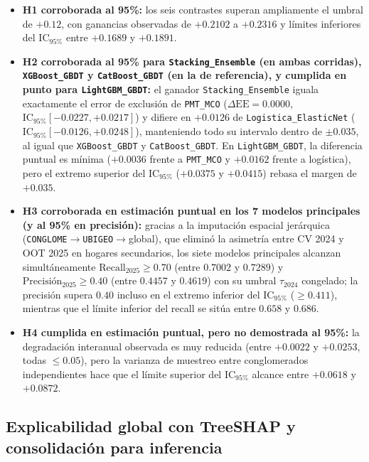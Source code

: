 \begin{itemize}
    \item \textbf{H1 corroborada al 95\%:} los seis contrastes superan ampliamente el umbral de $+0.12$, con ganancias observadas de $+0.2102$ a $+0.2316$ y límites inferiores del $\text{IC}_{95\%}$ entre $+0.1689$ y $+0.1891$.
    \item \textbf{H2 corroborada al 95\% para \texttt{Stacking\_Ensemble} (en ambas corridas), \texttt{XGBoost\_GBDT} y \texttt{CatBoost\_GBDT} (en la de referencia), y cumplida en punto para \texttt{LightGBM\_GBDT}:} el ganador \texttt{Stacking\_Ensemble} iguala exactamente el error de exclusión de \texttt{PMT\_MCO} ($\Delta\text{EE}=0.0000$, $\text{IC}_{95\%} [-0.0227, +0.0217]$) y difiere en $+0.0126$ de \texttt{Logistica\_ElasticNet} ($\text{IC}_{95\%} [-0.0126, +0.0248]$), manteniendo todo su intervalo dentro de $\pm 0.035$, al igual que \texttt{XGBoost\_GBDT} y \texttt{CatBoost\_GBDT}. En \texttt{LightGBM\_GBDT}, la diferencia puntual es mínima ($+0.0036$ frente a \texttt{PMT\_MCO} y $+0.0162$ frente a logística), pero el extremo superior del $\text{IC}_{95\%}$ ($+0.0375$ y $+0.0415$) rebasa el margen de $+0.035$.
    \item \textbf{H3 corroborada en estimación puntual en los 7 modelos principales (y al 95\% en precisión):} gracias a la imputación espacial jerárquica (\texttt{CONGLOME}$\rightarrow$\texttt{UBIGEO}$\rightarrow$global), que eliminó la asimetría entre CV 2024 y OOT 2025 en hogares secundarios, los siete modelos principales alcanzan simultáneamente $\text{Recall}_{2025} \ge 0.70$ (entre $0.7002$ y $0.7289$) y $\text{Precisión}_{2025} \ge 0.40$ (entre $0.4457$ y $0.4619$) con su umbral $\tau_{2024}$ congelado; la precisión supera $0.40$ incluso en el extremo inferior del $\text{IC}_{95\%}$ ($\ge 0.411$), mientras que el límite inferior del recall se sitúa entre $0.658$ y $0.686$.
    \item \textbf{H4 cumplida en estimación puntual, pero no demostrada al 95\%:} la degradación interanual observada es muy reducida (entre $+0.0022$ y $+0.0253$, todas $\le 0.05$), pero la varianza de muestreo entre conglomerados independientes hace que el límite superior del $\text{IC}_{95\%}$ alcance entre $+0.0618$ y $+0.0872$.
\end{itemize}

\subsection{Explicabilidad global con TreeSHAP y consolidación para inferencia}

